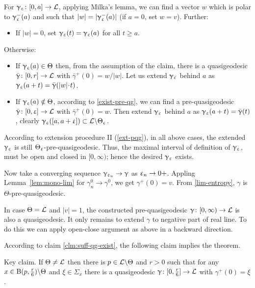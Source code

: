 For $\gamma_\eps\:[0,a]\to \spc{L}$, applying Milka's lemma, we can find a vector $w$ which is polar to $\upgamma_\upvarepsilon^-(a)$ and such that $|w|=|\upgamma_\upvarepsilon^-(a)|$ (if $a=0$, set $w=v$). 
Further:
\begin{itemize}
\item If $|w|=0$, set $\upgamma_\upvarepsilon(t)=\upgamma_\upvarepsilon(a)$ for all $t\ge a$. 
\end{itemize}
Otherwise:
\begin{itemize}
\item If $\gamma_\eps(a)\in\Theta$ then, from the assumption of the claim, there is a quasigeodesic $\bar\gamma\:[0,r]\to \spc{L}$ with $\bar\gamma^+(0)=w/|w|$.
Let us extend $\upgamma_\upvarepsilon$ behind $a$ as $\gamma_\eps(a+t)=\bar\gamma(|w|\cdot t)$.
\item If $\upgamma_\upvarepsilon(a)\notin\Theta$, according to \ref{exist-pre-qg},
we can find a pre-quasigeodesic $\bar\gamma\:[0,\eps]\to \spc{L}$ with $\bar\gamma^+(0)=w$.
Then extend $\upgamma_\upvarepsilon$ behind $a$ as $\upgamma_\upvarepsilon(a+t)=\bar{\upgamma}(t)$, clearly $\gamma_\eps([a,a+\eps])\subset \spc{L}\backslash\Theta_\eps$.
\end{itemize}
According to extension procedure II (\ref{ext-pqg}), in all above cases, the extended $\upgamma_\upvarepsilon$ is still $\Theta_\upvarepsilon$-pre-\nospace quasigeodesic.
Thus, the maximal interval of definition of $\upgamma_\upvarepsilon$, must be open and closed in $[0,\infty)$;
hence the desired $\upgamma_\upvarepsilon$ exists.

Now take a converging sequence $\gamma_{\eps_n}\to\gamma$ as $\eps_n\to0+$.
Appling Lemma~\ref{lem:mono-lim} for $\gamma_n^0\to\gamma^0$, we get $\gamma^+(0)=v$.
From \ref{lim-entropy}, $\gamma$ is $\Theta$-pre-quasigeodesic.

In case $\Theta=\mathcal{L}$ and $|v|=1$, the constructed pre-quasigeodesic $\gamma\:[0,\infty)\to \spc{L}$
is also a quasigeodesic.
It only remains to extend $\gamma$ to negative part of real line.
To do this we can apply open-close argument as above in a backward direction.
\claimqeds

According to claim \ref{clm:suff-qg-exist}, the following claim implies the theorem.

\begin{clm}{Key claim.}\label{clm:qg-main}
If $\Theta\not=\mathcal{L}$ then there is $p\in \spc{L}\backslash \Theta$ and $r>0$ such that for any $x\in\oBall(p,\tfrac{r}{6})\backslash \Theta$ and $\xi\in \Sigma_x$ there is a quasigeodesic $\gamma\:[0,\tfrac{r}{6}]\to \spc{L}$ with  $\gamma^+(0)=\xi$.
\end{clm}


